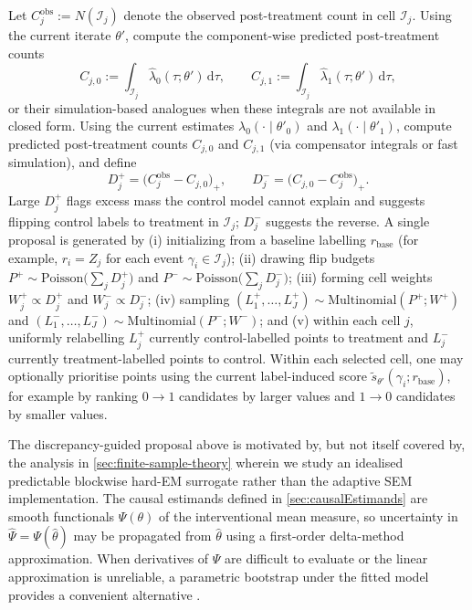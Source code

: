 \documentclass{statsoc}
\newcommand{\dd}{\mathrm{d}}
\newcommand{\1}{\mathbbm{1}}
\begin{document}
Let \(C_j^{\text{obs}}:=N(\mathcal I_j)\) denote the observed post-treatment count in cell \(\mathcal I_j\). Using the current iterate \(\theta'\), compute the component-wise predicted post-treatment counts
\[
C_{j,0}:=\int_{\mathcal I_j}\widehat\lambda_0(\tau;\theta')\,\dd\tau,
\qquad
C_{j,1}:=\int_{\mathcal I_j}\widehat\lambda_1(\tau;\theta')\,\dd\tau,
\]
or their simulation-based analogues when these integrals are not available in closed form. Using the current estimates \(\lambda_0(\cdot\mid\theta'_0)\) and \(\lambda_1(\cdot\mid\theta'_1)\), compute predicted post-treatment counts \(C_{j,0}\) and \(C_{j,1}\) (via compensator integrals or fast simulation), and define
\[
D_j^{+}=\bigl(C_j^{\text{obs}}-C_{j,0}\bigr)_+,
\qquad
D_j^{-}=\bigl(C_{j,0}-C_j^{\text{obs}}\bigr)_+.
\]
Large \(D_j^{+}\) flags excess mass the control model cannot explain and suggests flipping control labels to treatment in \(\mathcal I_j\); \(D_j^{-}\) suggests the reverse. A single proposal is generated by (i) initializing from a baseline labelling \(r_{\text{base}}\) (for example, \(r_i=Z_j\) for each event \(\gamma_i\in\mathcal I_j\)); (ii) drawing flip budgets \(P^{+}\sim\mathrm{Poisson}\!\bigl(\sum_j D_j^{+}\bigr)\) and \(P^{-}\sim\mathrm{Poisson}\!\bigl(\sum_j D_j^{-}\bigr)\); (iii) forming cell weights \(W_j^{+}\propto D_j^{+}\) and \(W_j^{-}\propto D_j^{-}\); (iv) sampling \((L_1^{+},\dots,L_J^{+})\sim\mathrm{Multinomial}(P^{+};W^{+})\) and \((L_1^{-},\dots,L_J^{-})\sim\mathrm{Multinomial}(P^{-};W^{-})\); and (v) within each cell \(j\), uniformly relabelling \(L_j^{+}\) currently control-labelled points to treatment and \(L_j^{-}\) currently treatment-labelled points to control. Within each selected cell, one may optionally prioritise points using the current label-induced score \(\tilde s_{\theta'}(\gamma_i;r_{\text{base}})\), for example by ranking \(0\to1\) candidates by larger values and \(1\to0\) candidates by smaller values.

The discrepancy-guided proposal above is motivated by, but not itself covered by, the analysis in \cref{sec:finite-sample-theory} wherein we study an idealised predictable blockwise hard-EM surrogate rather than the adaptive SEM implementation.  The causal estimands defined in \cref{sec:causalEstimands} are smooth functionals $\Psi(\theta)$ of the interventional mean measure, so uncertainty in $\hat\Psi=\Psi(\hat\theta)$ may be propagated from $\hat\theta$ using a first-order delta-method approximation. When derivatives of $\Psi$ are difficult to evaluate or the linear approximation is unreliable, a parametric bootstrap under the fitted model provides a convenient alternative \citep{davis2025multivariate}. 
\end{document}
